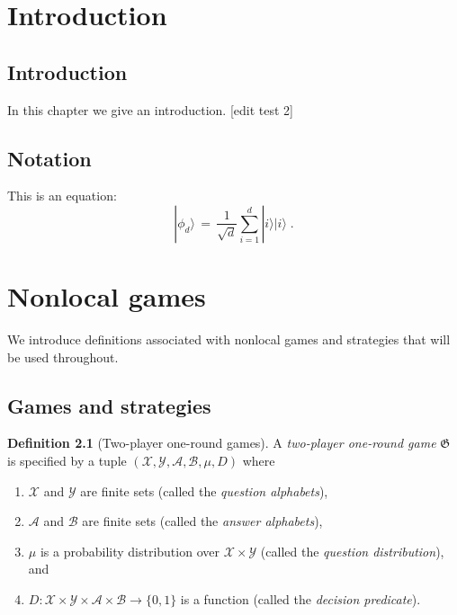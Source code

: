 \documentclass{book}
\theoremstyle{plain}
\theoremstyle{definition}
\newtheorem{definition}[subsection]{Definition}
\theoremstyle{remark}
\numberwithin{equation}{subsection}
\newcommand{\cal}[1]{\mathcal{#1}}
\newcommand{\ket}[1]{|#1\rangle}
\newcommand{\game}{\mathfrak{G}}
\begin{document}
%

\chapter{Introduction}



\label{section-phantom}


\section{Introduction}
\label{section:introduction}

In this chapter we give an introduction. [edit test 2]

\section{Notation}
\label{section-notation}

This is an equation:
\begin{equation}
\label{eq:me-state}
 \ket{\phi_d} \,=\,\frac{1}{\sqrt{d}} \sum_{i=1}^d \ket{i}\ket{i}\;.
\end{equation}







\chapter{Nonlocal games}



\label{section-phantom}



We introduce definitions associated with nonlocal games and strategies that will
be used throughout.

\section{Games and strategies}
\label{sec:strat}

\begin{definition}[Two-player one-round games]
  \label{def:game}
  A \emph{two-player one-round game} $\game$ is specified by a tuple
  $(\cal{X}, \cal{Y}, \cal{A}, \cal{B}, \mu, D)$ where
  \begin{enumerate}
  \item $\cal{X}$ and $\cal{Y}$ are finite sets (called the \emph{question
      alphabets}),
  \item $\cal{A}$ and $\cal{B}$ are finite sets (called the \emph{answer
      alphabets}),
  \item $\mu$ is a probability distribution over $\cal{X} \times \cal{Y}$
    (called the \emph{question distribution}), and
  \item $D: \cal{X} \times \cal{Y} \times \cal{A} \times \cal{B} \to \{0,1\}$ is
    a function (called the \emph{decision predicate}).
  \end{enumerate}
\end{definition}
\end{document}
